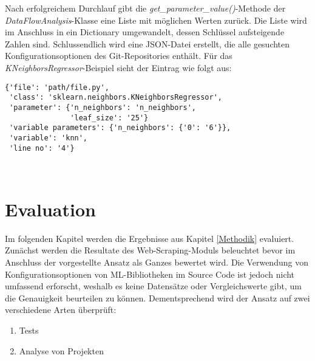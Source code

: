 \documentclass[german,bachelor]{swsLeipzig}
\begin{document}
Nach erfolgreichem Durchlauf gibt die \textit{get\_parameter\_value()}-Methode der \textit{DataFlowAnalysis}-Klasse
eine Liste mit möglichen Werten zurück.
Die Liste wird im Anschluss in ein Dictionary umgewandelt, dessen Schlüssel aufsteigende Zahlen sind.
Schlussendlich wird eine JSON-Datei erstellt, die alle gesuchten Konfigurationsoptionen des Git-Repositories enthält.
Für das \textit{KNeighborsRegressor}-Beispiel sieht der Eintrag wie folgt aus: \\

\noindent\begin{minipage}{\linewidth}
\begin{lstlisting}[frame=single, label=final_dict, basicstyle=\small, caption={Dictionary-Eintrag der KNeighborsRegressor-Klasse mit möglichen Parameterwerten},captionpos=b]
{'file': 'path/file.py',
 'class': 'sklearn.neighbors.KNeighborsRegressor',
 'parameter': {'n_neighbors': 'n_neighbors',
               'leaf_size': '25'}
 'variable parameters': {'n_neighbors': {'0': '6'}},
 'variable': 'knn',
 'line no': '4'}
\end{lstlisting}
\end{minipage}
\


\chapter{Evaluation}\label{Evaluation}
Im folgenden Kapitel werden die Ergebnisse aus Kapitel \ref{Methodik} evaluiert.
Zunächst werden die Resultate des Web-Scraping-Moduls beleuchtet bevor im Anschluss der vorgestellte Ansatz
als Ganzes bewertet wird.
Die Verwendung von Konfigurationsoptionen von ML-Bibliotheken im Source Code ist jedoch nicht umfassend erforscht,
weshalb es keine Datensätze oder Vergleichswerte gibt, um die Genauigkeit beurteilen zu können.
Dementsprechend wird der Ansatz auf zwei verschiedene Arten überprüft:
\begin{enumerate}
 \item Tests
 \item Analyse von Projekten
\end{enumerate}
\end{document}
